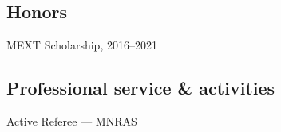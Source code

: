 \documentclass[12pt,letterpaper]{article}
\begin{document}
\subsection{Honors}
\begin{list}{}{\cvlist}

  \item MEXT Scholarship, 2016--2021

\end{list}


\subsection{Professional service \& activities}
\begin{list}{}{\cvlist}
  \item Active Referee ---
        MNRAS
\end{list}
\end{document}

